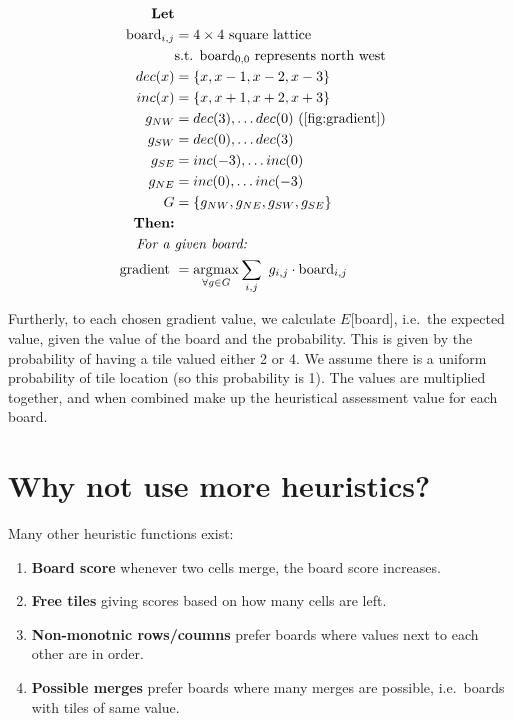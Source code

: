 \documentclass[journal]{IEEEtran}
\DeclareMathOperator*{\argmax}{\arg\!\max}
\begin{document}
\begin{framed}
\begin{align*}
    \textbf{Let} \\
    \text{\ board}_{i,j} &= 4\times{}4 \text{\ square lattice} \\
                            &\text{s.t. } \text{board}_{0,0} \text{\ represents north west} \\
    dec(x) &= \left\{x, x-1, x-2, x-3\right\} \\
    inc(x) &= \left\{x, x+1, x+2, x+3\right\} \\
    g_{NW} &= {dec(3), \dots dec(0)}~(\autoref{fig:gradient})\\
    g_{SW} &= {dec(0), \dots dec(3)} \\
    g_{SE} &= {inc(-3), \dots inc(0)} \\
    g_{NE} &= {inc(0), \dots inc(-3)} \\
    G &= \left\{g_{NW}, g_{NE}, g_{SW}, g_{SE}\right\} \\
    \textbf{Then:} \\
    \textit{For a } & \textit{given board:} \\
    \text{gradient } &= \argmax\limits_{\forall{}g \in G}\sum\limits_{i,j}{{\ g_{i,j} \cdot \text{board}_{i,j}}}
\end{align*}
\end{framed}

Furtherly, to each chosen gradient value, we calculate $E$[board], i.e.\ the
expected value, given the value of the board and the probability. This
is given by the probability of having a tile valued either 2 or 4. We assume
there is a uniform probability of tile location (so this probability is 1).
The values are multiplied together, and when combined make up 
the heuristical assessment value for each board.

\section*{Why not use more heuristics?}

Many other heuristic functions exist:
\begin{enumerate}
    \item\label{it:score} \textbf{Board score} \textendash{} whenever two cells merge, the board score increases.
    \item\label{it:free} \textbf{Free tiles} \textendash{} giving scores based on how many cells are left.
    \item\label{it:nonmono} \textbf{Non-monotnic rows/coumns} \textendash{}
        prefer boards where values next to each other are in order.
    \item\label{it:merges} \textbf{Possible merges} \textendash{} prefer boards
        where many merges are possible, i.e.\ boards with tiles of same value.
\end{enumerate}
\end{document}
